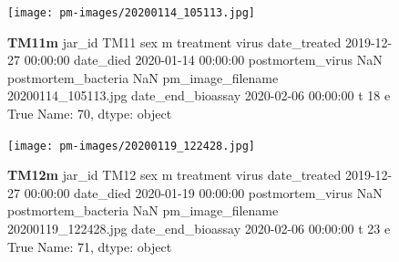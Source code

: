 \begin{figure}[h!]
\centering
\texttt{[image: pm-images/20200114\_105113.jpg]}
\caption{\textbf{TM11m} jar\_id                                TM11
sex                                      m
treatment                            virus
date\_treated           2019-12-27 00:00:00
date\_died              2020-01-14 00:00:00
postmortem\_virus                       NaN
postmortem\_bacteria                    NaN
pm\_image\_filename      20200114\_105113.jpg
date\_end\_bioassay      2020-02-06 00:00:00
t                                       18
e                                     True
Name: 70, dtype: object}
\end{figure}
\clearpage

\begin{figure}[h!]
\centering
\texttt{[image: pm-images/20200119\_122428.jpg]}
\caption{\textbf{TM12m} jar\_id                                TM12
sex                                      m
treatment                            virus
date\_treated           2019-12-27 00:00:00
date\_died              2020-01-19 00:00:00
postmortem\_virus                       NaN
postmortem\_bacteria                    NaN
pm\_image\_filename      20200119\_122428.jpg
date\_end\_bioassay      2020-02-06 00:00:00
t                                       23
e                                     True
Name: 71, dtype: object}
\end{figure}
\clearpage

